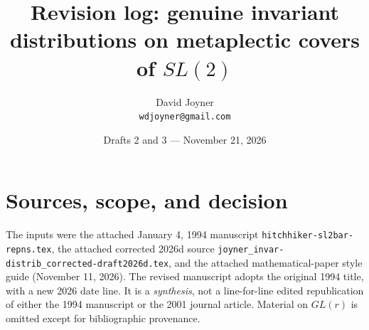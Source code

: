 \documentclass[12pt,letterpaper]{article}
\title{Revision log: genuine invariant distributions on metaplectic covers of $SL(2)$}
\author{David Joyner\\\texttt{wdjoyner@gmail.com}}
\date{Drafts 2 and 3 --- November 21, 2026}
\begin{document}
\maketitle
\section*{Sources, scope, and decision}
The inputs were the attached January 4, 1994 manuscript
\texttt{hitchhiker-sl2bar-repns.tex}, the attached corrected 2026d source
\texttt{joyner\_invar-distrib\_corrected-draft2026d.tex}, and the attached
mathematical-paper style guide (November 11, 2026).  The revised manuscript
adopts the original 1994 title, with a new 2026 date line.  It is a
\emph{synthesis}, not a line-for-line edited republication of either the
1994 manuscript or the 2001 journal article.  Material on $GL(r)$ is omitted
except for bibliographic provenance.
\end{document}
